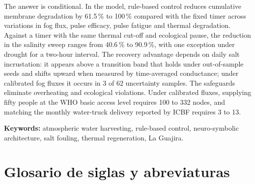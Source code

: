 The answer is conditional. In the model, rule-based control reduces cumulative membrane degradation by 61.5\,\% to 100\,\% compared with the fixed timer across variations in fog flux, pulse efficacy, pulse fatigue and thermal degradation. Against a timer with the same thermal cut-off and ecological pause, the reduction in the salinity sweep ranges from 40.6\,\% to 90.9\,\%, with one exception under drought for a two-hour interval. The recovery advantage depends on daily salt incrustation: it appears above a transition band that holds under out-of-sample seeds and shifts upward when measured by time-averaged conductance; under calibrated fog fluxes it occurs in 3 of 62 uncertainty samples. The safeguards eliminate overheating and ecological violations. Under calibrated fluxes, supplying fifty people at the WHO basic access level requires 100 to 332 nodes, and matching the monthly water-truck delivery reported by ICBF requires 3 to 13.

\medskip
\noindent\textbf{Keywords:} atmospheric water harvesting, rule-based control, neuro-symbolic architecture, salt fouling, thermal regeneration, La Guajira.

\chapter*{Glosario de siglas y abreviaturas}

